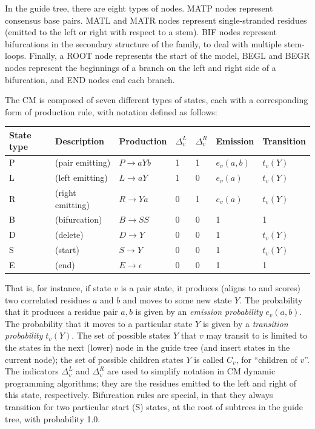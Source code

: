 \documentclass[11pt]{article}
\begin{document}
In the guide tree, there are eight types of nodes. MATP nodes
represent consensus base pairs. MATL and MATR nodes represent
single-stranded residues (emitted to the left or right with respect to
a stem). BIF nodes represent bifurcations in the secondary structure
of the family, to deal with multiple stem-loops. Finally, a ROOT node
represents the start of the model, BEGL and BEGR nodes represent the
beginnings of a branch on the left and right side of a bifurcation,
and END nodes end each branch.

The CM is composed of seven different types of states, each with a
corresponding form of production rule, with notation defined as
follows:

\vspace{0.5em}
\begin{tabular}{lllllll}
State type & Description &  Production   & $\Delta_v^{L}$ & $\Delta_v^{R}$ & Emission & Transition\\ \hline
P & (pair emitting)   & $P \rightarrow a Y b$ & 1 & 1 & $e_v(a,b)$ & $t_v(Y)$  \\
L & (left emitting)   & $L \rightarrow a Y$   & 1 & 0 & $e_v(a)$   & $t_v(Y)$  \\
R & (right emitting)  & $R \rightarrow Y a$   & 0 & 1 & $e_v(a)$   & $t_v(Y)$  \\
B & (bifurcation)     & $B \rightarrow S S$   & 0 & 0 & 1     &     1     \\
D & (delete)          & $D \rightarrow Y$     & 0 & 0 & 1     &   $t_v(Y)$  \\
S & (start)           & $S \rightarrow Y$     & 0 & 0 &    1     & $t_v(Y)$  \\
E & (end)             & $E \rightarrow \epsilon$ & 0 & 0 & 1     &     1     \\
\end{tabular}
\vspace{0.5em}

That is, for instance, if state $v$ is a pair state, it produces
(aligns to and scores) two correlated residues $a$ and $b$ and moves
to some new state $Y$.  The probability that it produces a residue
pair $a,b$ is given by an \emph{emission probability} $e_v(a,b)$.  The
probability that it moves to a particular state $Y$ is given by a
\emph{transition probability} $t_v(Y)$.  The set of possible states
$Y$ that $v$ may transit to is limited to the states in the next
(lower) node in the guide tree (and insert states in the current
node); the set of possible children states $Y$ is called $C_v$, for
``children of $v$''. The indicators $\Delta_v^{L}$ and $\Delta_v^{R}$
are used to simplify notation in CM dynamic programming algorithms;
they are the residues emitted to the left and right of this state,
respectively. Bifurcation rules are special, in that they always
transition for two particular start (S) states, at the root of
subtrees in the guide tree, with probability 1.0.
\end{document}
